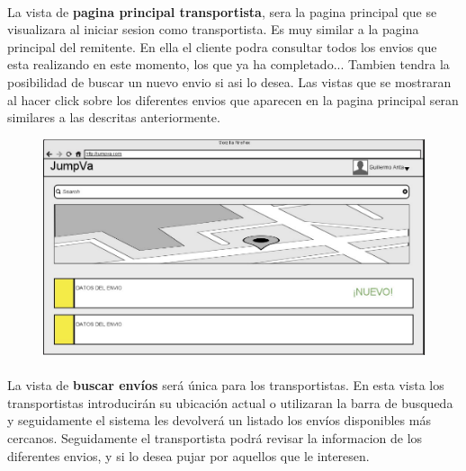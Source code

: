 \documentclass[10pt, a4paper,spanish]{article}
\begin{document}
			\paragraph{}
			La vista de \textbf{pagina principal transportista}, sera la pagina principal que se visualizara al iniciar sesion como transportista. Es muy similar a la pagina principal del remitente. En ella el cliente podra consultar todos los envios que esta realizando en este momento, los que ya ha completado... Tambien tendra la posibilidad de buscar un nuevo envio si asi lo desea. Las vistas que se mostraran al hacer click sobre los diferentes envios que aparecen en la pagina principal seran similares a las descritas anteriormente.


			\begin{figure}[H]
				\centering
				\begin{minipage}[b]{0.7\textwidth}
					\includegraphics[width=\textwidth]{res/BuscarEnviosTransportista.png}
				\end{minipage}
			\end{figure}

			\paragraph{}
			La vista de \textbf{buscar envíos} será única para los transportistas. En esta vista los transportistas introducirán su ubicación actual o utilizaran la barra de busqueda y seguidamente el sistema les devolverá un listado los envíos disponibles más cercanos. Seguidamente el transportista podrá revisar la informacion de los diferentes envios, y si lo desea pujar por aquellos que le interesen.
\end{document}
